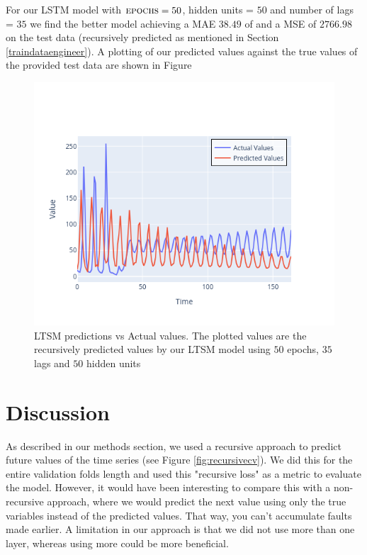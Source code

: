 \documentclass[conference]{IEEEtran}
\begin{document}
For our LSTM model with $\textsc{epochs} = 50$, hidden units = $50$ and number of lags = $35$ we 
find the better model achieving a MAE $38.49$ of and a MSE of $2766.98$ on the test data 
(recursively predicted as mentioned in Section \ref{traindataengineer}). A plotting of our 
predicted values against the true values of the provided test data are shown in Figure

\begin{figure}
    \includegraphics[scale=0.5]{pictures/newmodelresultlag35hu50.png}
    \caption{LTSM predictions vs Actual values. The plotted values are the recursively predicted 
    values by our LTSM model using $50$ epochs, $35$ lags and $50$ hidden units}
    \label{fig:modelresults}
\end{figure}

\section{Discussion}
As described in our methods section, we used a recursive approach to predict future values of the 
time series (see Figure \ref{fig:recursivecv}). We did this for the entire validation folds length 
and used this "recursive loss" as a metric to evaluate the model. However, it would have been 
interesting to compare this with a non-recursive approach, where we would predict the next value 
using only the true variables instead of the predicted values. That way, you can't accumulate faults 
made earlier.  
A limitation in our approach is that we did not use more than one layer, whereas using more could be
more beneficial.
\end{document}
